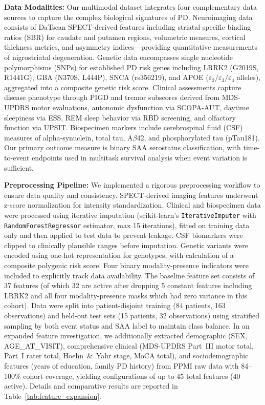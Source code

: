 \documentclass[journal,twoside,web]{ieeecolor}
\begin{document}
\textbf{Data Modalities:} Our multimodal dataset integrates four complementary data sources to capture the complex biological signatures of PD. Neuroimaging data consists of DaTscan SPECT-derived features including striatal specific binding ratios (SBR) for caudate and putamen regions, volumetric measures, cortical thickness metrics, and asymmetry indices---providing quantitative measurements of nigrostriatal degeneration. Genetic data encompasses single nucleotide polymorphisms (SNPs) for established PD risk genes including LRRK2 (G2019S, R1441G), GBA (N370S, L444P), SNCA (rs356219), and APOE ($\varepsilon_2 / \varepsilon_3 / \varepsilon_4$ alleles), aggregated into a composite genetic risk score. Clinical assessments capture disease phenotype through PIGD and tremor subscores derived from MDS-UPDRS motor evaluations, autonomic dysfunction via SCOPA-AUT, daytime sleepiness via ESS, REM sleep behavior via RBD screening, and olfactory function via UPSIT. Biospecimen markers include cerebrospinal fluid (CSF) measures of alpha-synuclein, total tau, A$\beta$42, and phosphorylated tau (pTau181). Our primary outcome measure is binary SAA serostatus classification, with time-to-event endpoints used in multitask survival analysis when event variation is sufficient.

\textbf{Preprocessing Pipeline:} We implemented a rigorous preprocessing workflow to ensure data quality and consistency. SPECT-derived imaging features underwent z-score normalization for intensity standardization. Clinical and biospecimen data were processed using iterative imputation (scikit-learn's \texttt{IterativeImputer} with \texttt{RandomForestRegressor} estimator, max 15 iterations), fitted on training data only and then applied to test data to prevent leakage. CSF biomarkers were clipped to clinically plausible ranges before imputation. Genetic variants were encoded using one-hot representation for genotypes, with calculation of a composite polygenic risk score. Four binary modality-presence indicators were included to explicitly track data availability. The baseline feature set consists of 37 features (of which 32 are active after dropping 5 constant features including LRRK2 and all four modality-presence masks which had zero variance in this cohort). Data were split into patient-disjoint training (84 patients, 163 observations) and held-out test sets (15 patients, 32 observations) using stratified sampling by both event status and SAA label to maintain class balance. In an expanded feature investigation, we additionally extracted demographic (SEX, AGE\_AT\_VISIT), comprehensive clinical (MDS-UPDRS Part~III motor total, Part~I rater total, Hoehn~\&~Yahr stage, MoCA total), and sociodemographic features (years of education, family PD history) from PPMI raw data with 84--100\% cohort coverage, yielding configurations of up to 45 total features (40 active). Details and comparative results are reported in Table~\ref{tab:feature_expansion}.
\end{document}
